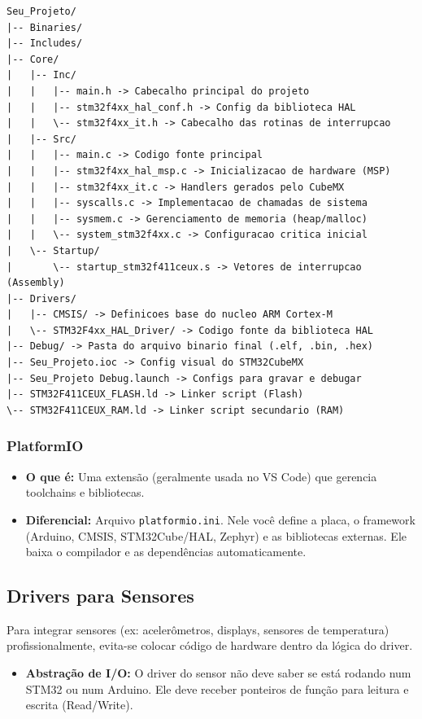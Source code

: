 \documentclass[12pt,a4paper]{article}
\begin{document}
\begin{verbatim}
Seu_Projeto/
|-- Binaries/
|-- Includes/
|-- Core/
|   |-- Inc/
|   |   |-- main.h -> Cabecalho principal do projeto 
|   |   |-- stm32f4xx_hal_conf.h -> Config da biblioteca HAL 
|   |   \-- stm32f4xx_it.h -> Cabecalho das rotinas de interrupcao
|   |-- Src/
|   |   |-- main.c -> Codigo fonte principal 
|   |   |-- stm32f4xx_hal_msp.c -> Inicializacao de hardware (MSP)
|   |   |-- stm32f4xx_it.c -> Handlers gerados pelo CubeMX 
|   |   |-- syscalls.c -> Implementacao de chamadas de sistema 
|   |   |-- sysmem.c -> Gerenciamento de memoria (heap/malloc)
|   |   \-- system_stm32f4xx.c -> Configuracao critica inicial 
|   \-- Startup/
|       \-- startup_stm32f411ceux.s -> Vetores de interrupcao (Assembly)
|-- Drivers/
|   |-- CMSIS/ -> Definicoes base do nucleo ARM Cortex-M 
|   \-- STM32F4xx_HAL_Driver/ -> Codigo fonte da biblioteca HAL
|-- Debug/ -> Pasta do arquivo binario final (.elf, .bin, .hex) 
|-- Seu_Projeto.ioc -> Config visual do STM32CubeMX 
|-- Seu_Projeto Debug.launch -> Configs para gravar e debugar 
|-- STM32F411CEUX_FLASH.ld -> Linker script (Flash)
\-- STM32F411CEUX_RAM.ld -> Linker script secundario (RAM)
\end{verbatim}

\subsubsection{PlatformIO}
\begin{itemize}
    \item \textbf{O que é:} Uma extensão (geralmente usada no VS Code) que gerencia toolchains e bibliotecas.
    \item \textbf{Diferencial:} Arquivo \texttt{platformio.ini}. Nele você define a placa, o framework (Arduino, CMSIS, STM32Cube/HAL, Zephyr) e as bibliotecas externas. Ele baixa o compilador e as dependências automaticamente.
\end{itemize}

\subsection{Drivers para Sensores}
Para integrar sensores (ex: acelerômetros, displays, sensores de temperatura) profissionalmente, evita-se colocar código de hardware dentro da lógica do driver.
\begin{itemize}
    \item \textbf{Abstração de I/O:} O driver do sensor não deve saber se está rodando num STM32 ou num Arduino. Ele deve receber ponteiros de função para leitura e escrita (Read/Write).
\end{itemize}
\end{document}
